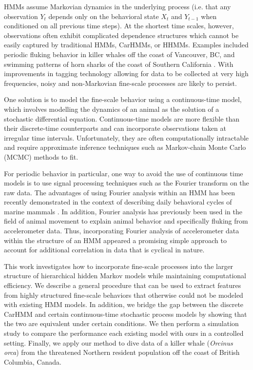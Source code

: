 HMMs assume Markovian dynamics in the underlying process (i.e. that any observation $Y_t$ depends only on the behavioral state $X_t$ and $Y_{t-1}$ when conditioned on all previous time steps). At the shortest time scales, however, observations often exhibit complicated dependence structures which cannot be easily captured by traditional HMMs, CarHMMs, or HHMMs. Examples included periodic fluking behavior in killer whales off the coast of Vancouver, BC, and swimming patterns of horn sharks of the coast of Southern California \citep{Adam:2019}.  With improvements in tagging technology allowing for data to be collected at very high frequencies, noisy and non-Markovian fine-scale processes are likely to persist.

One solution is to model the fine-scale behavior using a continuous-time model, which involves modelling the dynamics of an animal as the solution of a stochastic differential equation. Continuous-time models are more flexible than their discrete-time counterparts and can incorporate observations taken at irregular time intervals. Unfortunately, they are often computationally intractable and require approximate inference techniques such as Markov-chain Monte Carlo (MCMC) methods to fit.

For periodic behavior in particular, one way to avoid the use of continuous time models is to use signal processing techniques such as the Fourier transform on the raw data. The advantages of using Fourier analysis within an HMM has been recently demonstrated in the context of describing daily behavioral cycles of marine mammals \citep{Heerah:2017}. In addition, Fourier analysis has previously been used in the field of animal movement to explain animal behavior \citep{Fehlmann:2017} and specifically fluking \citep{Shorter:2017} from accelerometer data. Thus, incorporating Fourier analysis of accelerometer data within the structure of an HMM appeared a promising simple approach to account for additional correlation in data that is cyclical in nature.

This work investigates how to incorporate fine-scale processes into the larger structure of hierarchical hidden Markov models while maintaining computational efficiency. We describe a general procedure that can be used to extract features from highly structured fine-scale behaviors that otherwise could not be modeled with existing HMM models. In addition, we bridge the gap between the discrete CarHMM and certain continuous-time stochastic process models by showing that the two are equivalent under certain conditions. We then perform a simulation study to compare the performance each existing model with ours in a controlled setting. Finally, we apply our method to dive data of a killer whale (\textit{Orcinus orca}) from the threatened Northern resident population off the coast of British Columbia, Canada.


